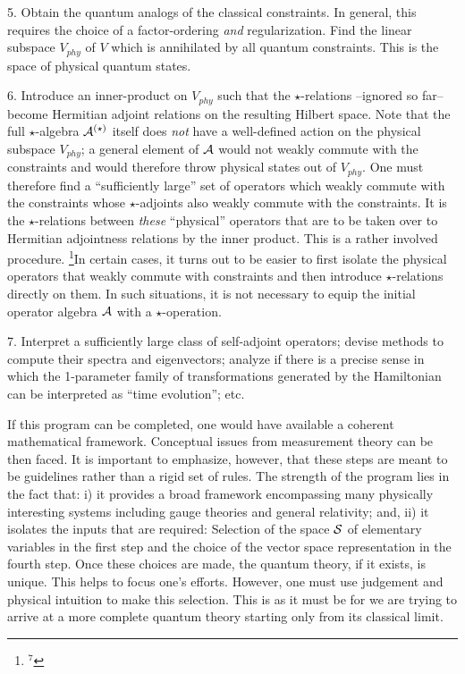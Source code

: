 \item{5.} Obtain the quantum analogs of the classical constraints. In general,
this requires the choice of a factor-ordering {\it and} regularization. Find
the linear subspace $V_{phy}$ of $V$ which is annihilated by all quantum
constraints. This is the space of physical quantum states.
\item{6.} Introduce an inner-product on $V_{phy}$ such that the
$\star$-relations --ignored so far-- become Hermitian adjoint relations on
the resulting Hilbert space. Note that the full $\star$-algebra
${\cal A}^{(\star)}$ itself does {\it not} have a well-defined action on the
physical subspace $V_{phy}$; a general element of ${\cal A}$ would not weakly
commute with the constraints and would therefore throw physical states out
of $V_{phy}$. One must therefore find a ``sufficiently large'' set of
operators which weakly commute with the constraints whose $\star$-adjoints
also weakly commute with the constraints. It is the $\star$-relations between
{\it these} ``physical'' operators that are to be taken over to Hermitian
adjointness relations by the inner product. This is a rather involved
procedure.
\footnote{$^7$}{In certain cases, it turns out to be easier to first isolate
the physical operators that weakly commute with constraints and then
introduce $\star$-relations directly on them. In such situations, it is
not necessary to equip the initial operator algebra ${\cal A}$ with a
$\star$-operation.}
\item{7.} Interpret a sufficiently large class of self-adjoint operators;
devise methods to compute their spectra and eigenvectors; analyze if there is
a precise sense in which the 1-parameter family of transformations generated
by the Hamiltonian can be interpreted as ``time evolution''; etc.

If this program can be completed, one would have available a coherent
mathematical framework. Conceptual issues from measurement theory can
be then faced. It is important to emphasize, however, that these steps
are meant to be guidelines rather than a rigid set of rules. The strength
of the program lies in the fact that: i) it provides a broad framework
encompassing many physically interesting systems including gauge theories and
general relativity; and, ii) it isolates the inputs that are required:
Selection of the space ${\cal S}$ of elementary variables in the first step
and the choice of the vector space representation in the fourth step. Once
these choices are made, the quantum theory, if it exists, is unique. This
helps to focus one's efforts. However, one must use judgement and physical
intuition to make this selection. This is as it must be for we are trying
to arrive at a more complete quantum theory starting only from its classical
limit.

